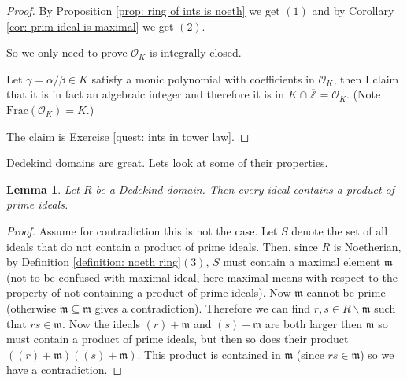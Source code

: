 \documentclass[11pt,a4paper]{report}
\theoremstyle{plain}
\newtheorem{lem}[subsection]{Lemma}
\theoremstyle{definition}
\theoremstyle{definition}
\newcommand{\ZZ}{\mathbb{Z}}
\def\gothm{\mathfrak{m}}
\def \a{\alpha}
\def \g {\gamma}
\def \OO {\mathcal{O}}
\def \ov{\overline}
\begin{document}
	
	\begin{proof}
		
		By 	Proposition \ref{prop: ring of ints is noeth} we get $(1)$ and by Corollary \ref{cor: prim ideal is maximal} we get $(2)$.
		
		So we only need to prove $\OO_K$ is integrally closed. 
		
		Let $\gamma=\a / \beta \in K$ satisfy a monic polynomial with coefficients in $\OO_K$, then I claim that it is in fact an algebraic integer and therefore it is in $K \cap \ov{\ZZ}=\OO_K$. (Note $\mathrm{Frac}(\OO_K)=K$.) 
		
		The claim is Exercise \ref{quest: ints in tower law}.
		
		
		
		
		
		
		
		
	\end{proof}
	
	Dedekind domains are great. Lets look at some of their properties.
	
	
	\begin{lem}\label{lem: ded dom ideal has prim ideals}
		Let $R$ be a Dedekind domain. Then every ideal contains a product of prime ideals.
	\end{lem}
	
	\begin{proof}
		Assume for contradiction this is not the case. Let $S$ denote the set of all ideals that do not contain a product of prime ideals. Then, since $R$ is Noetherian, by Definition \ref{definition: noeth ring}$(3)$, $S$ must contain a maximal element $\gothm$ (not to be confused with maximal ideal, here maximal means with respect to the property of not containing a product of prime ideals). Now $\gothm$ cannot be prime (otherwise $\gothm \subseteq \gothm$ gives a contradiction). Therefore we can find $r,s \in R \backslash \gothm$ such that $rs \in \gothm$. Now the ideals $(r)+\gothm$ and $(s)+\gothm$ are both larger then $\gothm$ so must contain a product of prime ideals, but then so does their product $((r)+\gothm)((s)+\gothm)$. This product is contained in $\gothm$ (since $rs \in \gothm$) so we have a contradiction.
	\end{proof}
	
\end{document}
